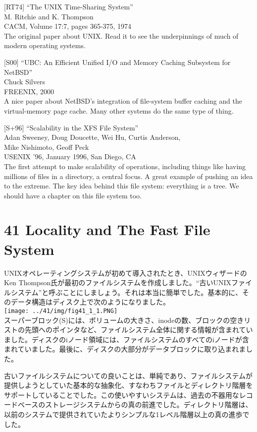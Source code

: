 {[}RT74{]} ``The UNIX Time-Sharing System''\\
M. Ritchie and K. Thompson\\
CACM, Volume 17:7, pages 365-375, 1974\\
The original paper about UNIX. Read it to see the underpinnings of much
of modern operating systems.

{[}S00{]} ``UBC: An Efficient Unified I/O and Memory Caching Subsystem
for NetBSD''\\
Chuck Silvers\\
FREENIX, 2000\\
A nice paper about NetBSD's integration of file-system buffer caching
and the virtual-memory page cache. Many other systems do the same type
of thing.

{[}S+96{]} ``Scalability in the XFS File System''\\
Adan Sweeney, Doug Doucette, Wei Hu, Curtis Anderson,\\
Mike Nishimoto, Geoff Peck\\
USENIX '96, January 1996, San Diego, CA\\
The first attempt to make scalability of operations, including things
like having millions of files in a directory, a central focus. A great
example of pushing an idea to the extreme. The key idea behind this file
system: everything is a tree. We should have a chapter on this file
system too.

\newpage

\hypertarget{locality-and-the-fast-file-system}{%
\section*{41 Locality and The Fast File
System}\label{locality-and-the-fast-file-system}}

UNIXオペレーティングシステムが初めて導入されたとき、UNIXウィザードのKen
Thompson氏が最初のファイルシステムを作成しました。``古いUNIXファイルシステム''と呼ぶことにしましょう。それは本当に簡単でした。基本的に、そのデータ構造はディスク上で次のようになりました。\\
\texttt{[image: ../41/img/fig41\_1\_1.PNG]}\\
スーパーブロック(S)には、ボリュームの大きさ、inodeの数、ブロックの空きリストの先頭へのポインタなど、ファイルシステム全体に関する情報が含まれていました。ディスクのiノード領域には、ファイルシステムのすべてのiノードが含まれていました。最後に、ディスクの大部分がデータブロックに取り込まれました。

古いファイルシステムについての良いことは、単純であり、ファイルシステムが提供しようとしていた基本的な抽象化、すなわちファイルとディレクトリ階層をサポートしていることでした。この使いやすいシステムは、過去の不器用なレコードベースのストレージシステムからの真の前進でした。ディレクトリ階層は、以前のシステムで提供されていたよりシンプルな1レベル階層以上の真の進歩でした。

